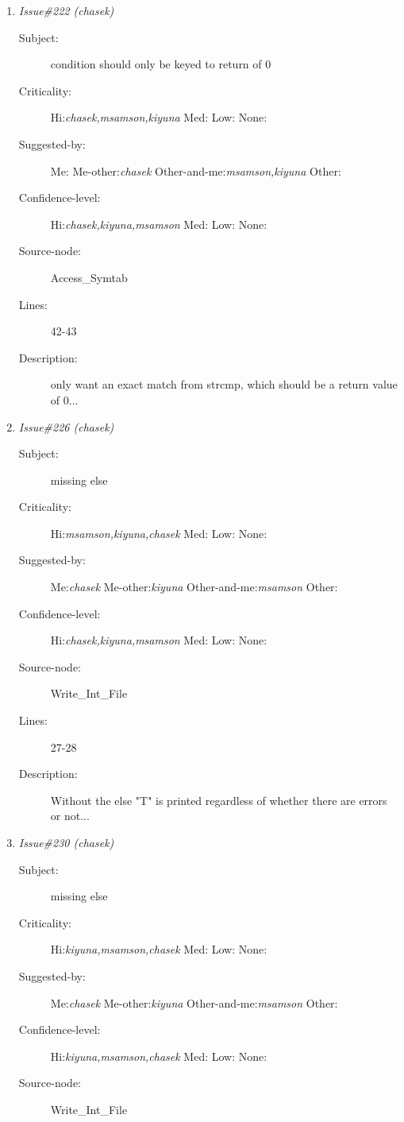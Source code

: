 \begin{enumerate}
\begin{description}
\item [Lines:] 22-23

\item [Description:] Should only accept if strncmp is NOT equal to zero...
\end{description}
\item {\it Issue\#222 (chasek)}
\begin{description}
\item [Subject:] condition should only be keyed to return of 0
\item [Criticality:] Hi:{\it chasek,msamson,kiyuna} Med:{\it } Low:{\it } None:{\it }
\item [Suggested-by:] Me:{\it } Me-other:{\it chasek} Other-and-me:{\it msamson,kiyuna} Other:{\it }
\item [Confidence-level:] Hi:{\it chasek,kiyuna,msamson} Med:{\it } Low:{\it } None:{\it }
\item [Source-node:] Access\_Symtab

\item [Lines:] 42-43

\item [Description:] only want an exact match from strcmp, which
should be a return value of 0...
\end{description}
\item {\it Issue\#226 (chasek)}
\begin{description}
\item [Subject:] missing else
\item [Criticality:] Hi:{\it msamson,kiyuna,chasek} Med:{\it } Low:{\it } None:{\it }
\item [Suggested-by:] Me:{\it chasek} Me-other:{\it kiyuna} Other-and-me:{\it msamson} Other:{\it }
\item [Confidence-level:] Hi:{\it chasek,kiyuna,msamson} Med:{\it } Low:{\it } None:{\it }
\item [Source-node:] Write\_Int\_File

\item [Lines:] 27-28

\item [Description:] Without the else "T" is printed regardless of
whether there are errors or not...
\end{description}
\item {\it Issue\#230 (chasek)}
\begin{description}
\item [Subject:] missing else
\item [Criticality:] Hi:{\it kiyuna,msamson,chasek} Med:{\it } Low:{\it } None:{\it }
\item [Suggested-by:] Me:{\it chasek} Me-other:{\it kiyuna} Other-and-me:{\it msamson} Other:{\it }
\item [Confidence-level:] Hi:{\it kiyuna,msamson,chasek} Med:{\it } Low:{\it } None:{\it }
\item [Source-node:] Write\_Int\_File


\end{description}
\end{enumerate}
